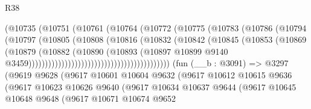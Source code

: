 \begin{lexlean}{R38}
\begin{coremodule}
                                            (@10735
                                              (@10751
                                                (@10761
                                                  (@10764
                                                    (@10772
                                                      (@10775
                                                        (@10783
                                                          (@10786
                                                            (@10794
                                                              (@10797
                                                                (@10805
                                                                  (@10808
                                                                    (@10816
                                                                      (@10832
                                                                        (@10842
                                                                          (@10845
                                                                            (@10853
                                                                              (@10869
                                                                                (@10879
                                                                                  (@10882
                                                                                    (@10890
                                                                                      (@10893
                                                                                        (@10897
                                                                                          @10899
                                                                                          @9140
                                                                                          @3459)))))))))))))))))))))))))))))))))))))))))))
    (fun (__b : @3091) =>
    @3297
      (@9619
        @9628
        (@9617
          @10601
          @10604
          @9632
          (@9617
            @10612
            @10615
            @9636
            (@9617
              @10623
              @10626
              @9640
              (@9617
                @10634
                @10637
                @9644
                (@9617
                  @10645
                  @10648
                  @9648
                  (@9617
                    @10671
                    @10674
                    @9652

\end{coremodule}
\end{lexlean}
